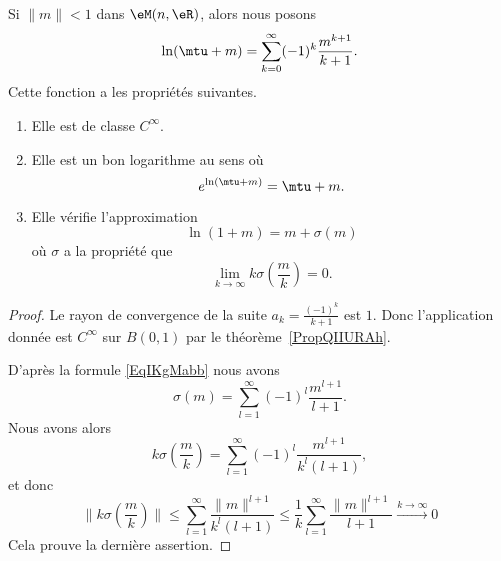 \begin{lemma}   \label{LemQZIQxaB}
    Si \( \| m \|<1\) dans \( \eM(n,\eR)\), alors nous posons
    \begin{equation}    \label{EqIKgMabb}
        \ln(\mtu+m)=\sum_{k=0}^{\infty}(-1)^k\frac{ m^{k+1} }{ k+1 }.
    \end{equation}
    Cette fonction a les propriétés suivantes.
    \begin{enumerate}
        \item
            Elle est de classe \(  C^{\infty}\).
        \item
            Elle est un bon logarithme au sens où
            \begin{equation}
                e^{\ln(\mtu+m)}=\mtu+m.
            \end{equation}
        \item
            Elle vérifie l'approximation
            \begin{equation}
                \ln(1+m)=m+\sigma(m)
            \end{equation}
            où \( \sigma\) a la propriété que
            \begin{equation}
                \lim_{k\to \infty} k\sigma\left( \frac{ m }{ k } \right)=0.
            \end{equation}
    \end{enumerate}
\end{lemma}

\begin{proof}

    Le rayon de convergence de la suite \( a_k=\frac{ (-1)^k }{ k+1 }\) est \( 1\). Donc l'application donnée est \(  C^{\infty}\) sur \( B(0,1)\) par le théorème~\ref{PropQIIURAh}.

    D'après la formule \eqref{EqIKgMabb} nous avons
    \begin{equation}
        \sigma(m)=\sum_{l=1}^{\infty}(-1)^l\frac{ m^{l+1} }{ l+1 }.
    \end{equation}
    Nous avons alors
    \begin{equation}
        k\sigma(\frac{ m }{ k })=\sum_{l=1}^{\infty}(-1)^l\frac{ m^{l+1} }{ k^l(l+1) },
    \end{equation}
    et donc
    \begin{equation}
        \| k\sigma(\frac{ m }{ k }) \|\leq \sum_{l=1}^{\infty}\frac{ \| m \|^{l+1} }{ k^l(l+1) }\leq\frac{1}{ k }\sum_{l=1}^{\infty}\frac{ \| m \|^{l+1} }{ l+1 }\stackrel{k\to\infty}{\to} 0
    \end{equation}
    Cela prouve la dernière assertion.
\end{proof}

